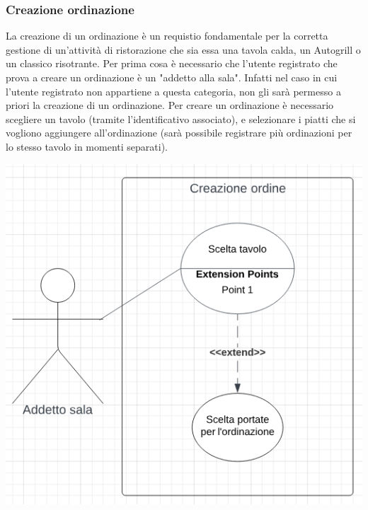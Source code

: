 \subsubsection{Creazione ordinazione}
La creazione di un ordinazione è un requistio fondamentale per la corretta gestione di un'attività di ristorazione che sia essa una tavola calda, un Autogrill o un classico risotrante. Per prima cosa è necessario che l'utente registrato che prova a creare un ordinazione è un "addetto alla sala". Infatti nel caso in cui l'utente registrato non appartiene a questa categoria, non gli sarà permesso a priori la creazione di un ordinazione. Per creare un ordinazione è necessario scegliere un tavolo (tramite l'identificativo associato), e selezionare i piatti che si vogliono aggiungere all'ordinazione (sarà possibile registrare più ordinazioni per lo stesso tavolo in momenti separati).
\begin{center}
  \includegraphics[scale=1]{img/use_case/use_case-creazione_ordine.png}
\end{center}
\newpage
